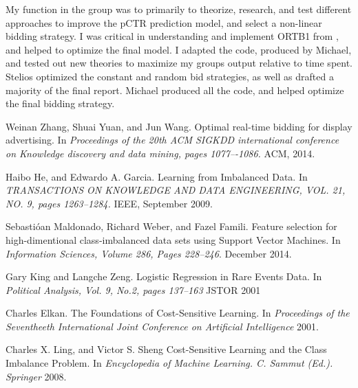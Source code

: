 \documentclass{sig-alternate-05-2015}
\begin{document}
My function in the group was to primarily to theorize, research, and test different approaches to improve the pCTR prediction model, and select a non-linear bidding strategy.  I was critical in understanding and implement ORTB1 from \cite{nonlinear}, and helped to optimize the final model.  I adapted the code, produced by Michael, and tested out new theories to maximize my groups output relative to time spent.  Stelios optimized the constant and random bid strategies, as well as drafted a majority of the final report. Michael produced all the code, and helped optimize the final bidding strategy.

\begin{thebibliography}{5}

Weinan Zhang, Shuai Yuan, and Jun Wang.
Optimal real-time bidding for display advertising. In
\textit{Proceedings of the 20th ACM SIGKDD international conference on Knowledge discovery and data mining, pages 1077–-1086.}
ACM, 2014.

Haibo He, and Edwardo A. Garcia.
Learning from Imbalanced Data. In
\textit{TRANSACTIONS ON KNOWLEDGE AND DATA ENGINEERING, VOL. 21, NO. 9, pages 1263--1284.}
IEEE, September 2009.

Sebasti\'oan Maldonado, Richard Weber, and Fazel Famili.
Feature selection for high-dimentional class-imbalanced data sets using Support Vector Machines. In
\textit{Information Sciences, Volume 286, Pages 228--246}.
December 2014.

Gary King and Langche Zeng.
Logistic Regression in Rare Events Data. In
\textit{Political Analysis, Vol. 9, No.2, pages 137--163}
JSTOR 2001

Charles Elkan.
The Foundations of Cost-Sensitive Learning. In
\textit{Proceedings of the Seventheeth International Joint Conference on Artificial Intelligence}
2001.

Charles X. Ling, and Victor S. Sheng
Cost-Sensitive Learning and the Class Imbalance Problem. In
\textit{Encyclopedia of Machine Learning. C. Sammut (Ed.). Springer}
2008.

\end{thebibliography}
\end{document}
